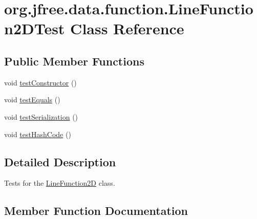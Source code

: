 \hypertarget{classorg_1_1jfree_1_1data_1_1function_1_1_line_function2_d_test}{}\section{org.\+jfree.\+data.\+function.\+Line\+Function2\+D\+Test Class Reference}
\label{classorg_1_1jfree_1_1data_1_1function_1_1_line_function2_d_test}
\subsection*{Public Member Functions}
\begin{DoxyCompactItemize}
\item 
void \mbox{\hyperlink{classorg_1_1jfree_1_1data_1_1function_1_1_line_function2_d_test_ac4777134804357d230002051e6c8b9c8}{test\+Constructor}} ()
\item 
void \mbox{\hyperlink{classorg_1_1jfree_1_1data_1_1function_1_1_line_function2_d_test_ab96cf180c05ac21a76d9b6cae404456b}{test\+Equals}} ()
\item 
void \mbox{\hyperlink{classorg_1_1jfree_1_1data_1_1function_1_1_line_function2_d_test_a3b86dd173dec5104c02378b6553208ac}{test\+Serialization}} ()
\item 
void \mbox{\hyperlink{classorg_1_1jfree_1_1data_1_1function_1_1_line_function2_d_test_afa53eefa7df54d788ca1d26f2871d587}{test\+Hash\+Code}} ()
\end{DoxyCompactItemize}


\subsection{Detailed Description}
Tests for the \mbox{\hyperlink{classorg_1_1jfree_1_1data_1_1function_1_1_line_function2_d}{Line\+Function2D}} class. 

\subsection{Member Function Documentation}
\mbox{\label{classorg_1_1jfree_1_1data_1_1function_1_1_line_function2_d_test_ac4777134804357d230002051e6c8b9c8}} 
